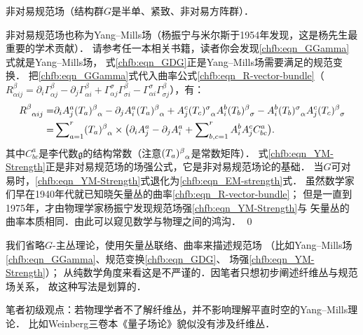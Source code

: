 \begin{example}
	非对易规范场（结构群$G$是半单、紧致、非对易方阵群）．
\end{example}
非对易规范场也称为Yang--Mills场（杨振宁与米尔斯于1954年发现，这是杨先生最重要的学术贡献）．
请参考任一本相关书籍，读者你会发现\eqref{chfb:eqn_GGamma}式就是Yang--Mills场，
式\eqref{chfb:eqn_GDG}正是Yang--Mills场需要满足的规范变换．
把\eqref{chfb:eqn_GGamma}式代入曲率公式\eqref{chfb:eqn_R-vector-bundle}（$R_{\alpha i j}^\beta 
= {\partial_i} \Gamma_{\alpha j}^{\beta} -\partial_j \Gamma_{\alpha i}^{\beta}
+\Gamma_{\alpha j}^{\sigma} \Gamma_{\sigma i}^{\beta} 
-  \Gamma_{\alpha i}^{\sigma}\Gamma_{\sigma j}^{\beta}$），有：
\begin{align}
	R_{\hphantom{\alpha}\alpha i j}^\beta 
	=&{\partial_i} A^a_j (T_a)_{\hphantom{\alpha}\alpha}^\beta 
	-\partial_j A^a_i (T_a)_{\hphantom{\alpha}\alpha}^\beta 
	+A^c_j (T_c)_{\hphantom{\alpha}\alpha}^\sigma  A^b_i (T_b)_{\hphantom{\alpha}\sigma}^\beta
	-A^b_i (T_b)_{\hphantom{\alpha}\alpha}^\sigma  A^c_j (T_c)_{\hphantom{\alpha}\sigma}^\beta \notag\\
	=& \sum\nolimits_{a=1}^{r}(T_a)_{\hphantom{\alpha}\alpha}^\beta  \times \bigl(
	{\partial_i} A^a_j  -\partial_j A^a_i  + \sum\nolimits_{b,c=1}^{r} A^b_i A^c_j C_{bc}^a    \bigr) .
	\label{chfb:eqn_YM-Strength}
\end{align}
其中$C_{bc}^a$是李代数$\mathfrak{g}$的结构常数（注意$(T_a)_{\hphantom{\alpha}\alpha}^\beta $是常数矩阵）．
式\eqref{chfb:eqn_YM-Strength}正是非对易规范场的场强公式，它是非对易规范场论的基础．
当$G$可对易时，\eqref{chfb:eqn_YM-Strength}式退化为\eqref{chfb:eqn_EM-strength}式．
虽然数学家们早在1940年代就已知晓矢量丛的曲率\eqref{chfb:eqn_R-vector-bundle}；
但是一直到1975年，才由物理学家杨振宁发现规范场强\eqref{chfb:eqn_YM-Strength}与
矢量丛的曲率本质相同．由此可以窥见数学与物理之间的鸿沟．
\qed


\begin{remark}
	我们{\kaishu 省略$G$-主丛理论}，使用矢量丛联络、曲率来描述规范场
	（比如Yang--Mills场\eqref{chfb:eqn_GGamma}、规范变换\eqref{chfb:eqn_GDG}、
	场强\eqref{chfb:eqn_YM-Strength}）；
	从纯数学角度来看这是不严谨的．因笔者只想初步阐述纤维丛与规范场关系，
	故这种写法是划算的．
\end{remark}

\begin{remark}\label{chfb:rem_qft}
	笔者初级观点：若物理学者不了解纤维丛，并不影响理解平直时空的Yang--Mills理论．
	比如Weinberg三卷本《量子场论》貌似没有涉及纤维丛．
\end{remark}




